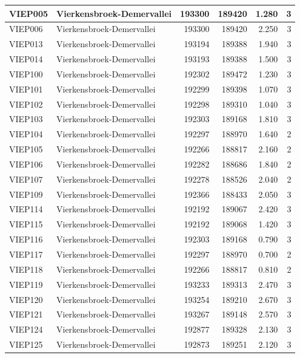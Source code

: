 \documentclass[11pt,]{book}
\begin{document}
\begin{table}
\begin{tabular}[t]{l|l|r|r|r|r}
\hline
VIEP005 & Vierkensbroek-Demervallei & 193300 & 189420 & 1.280 & 3\\
\hline
VIEP006 & Vierkensbroek-Demervallei & 193300 & 189420 & 2.250 & 3\\
\hline
VIEP013 & Vierkensbroek-Demervallei & 193194 & 189388 & 1.940 & 3\\
\hline
VIEP014 & Vierkensbroek-Demervallei & 193193 & 189388 & 1.500 & 3\\
\hline
VIEP100 & Vierkensbroek-Demervallei & 192302 & 189472 & 1.230 & 3\\
\hline
VIEP101 & Vierkensbroek-Demervallei & 192299 & 189398 & 1.070 & 3\\
\hline
VIEP102 & Vierkensbroek-Demervallei & 192298 & 189310 & 1.040 & 3\\
\hline
VIEP103 & Vierkensbroek-Demervallei & 192303 & 189168 & 1.810 & 3\\
\hline
VIEP104 & Vierkensbroek-Demervallei & 192297 & 188970 & 1.640 & 2\\
\hline
VIEP105 & Vierkensbroek-Demervallei & 192266 & 188817 & 2.160 & 2\\
\hline
VIEP106 & Vierkensbroek-Demervallei & 192282 & 188686 & 1.840 & 2\\
\hline
VIEP107 & Vierkensbroek-Demervallei & 192278 & 188526 & 2.040 & 2\\
\hline
VIEP109 & Vierkensbroek-Demervallei & 192366 & 188433 & 2.050 & 3\\
\hline
VIEP114 & Vierkensbroek-Demervallei & 192192 & 189067 & 2.420 & 3\\
\hline
VIEP115 & Vierkensbroek-Demervallei & 192192 & 189068 & 1.420 & 3\\
\hline
VIEP116 & Vierkensbroek-Demervallei & 192303 & 189168 & 0.790 & 3\\
\hline
VIEP117 & Vierkensbroek-Demervallei & 192297 & 188970 & 0.700 & 2\\
\hline
VIEP118 & Vierkensbroek-Demervallei & 192266 & 188817 & 0.810 & 2\\
\hline
VIEP119 & Vierkensbroek-Demervallei & 193233 & 189313 & 2.470 & 3\\
\hline
VIEP120 & Vierkensbroek-Demervallei & 193254 & 189210 & 2.670 & 3\\
\hline
VIEP121 & Vierkensbroek-Demervallei & 193267 & 189148 & 2.570 & 3\\
\hline
VIEP124 & Vierkensbroek-Demervallei & 192877 & 189328 & 2.130 & 3\\
\hline
VIEP125 & Vierkensbroek-Demervallei & 192873 & 189251 & 2.120 & 3\\

\end{tabular}
\end{table}
\end{document}
